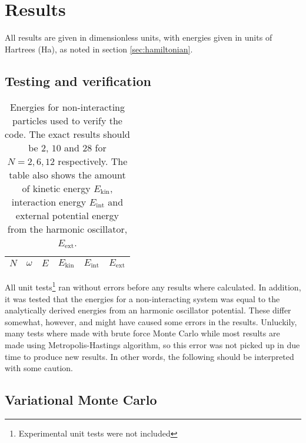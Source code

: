 \documentclass[aps,prb,twocolumn,floatfix]{revtex4}
\begin{document}

\section{Results} \label{sec:results}

All results are given in dimensionless units, with energies given in units of Hartrees (Ha), as noted in section \ref{sec:hamiltonian}.

\subsection{Testing and verification}

\begin{table}
\centering
\begin{tabular}{c c c c c c}
    \hline
    \hline
    $N$ & $\omega$ & $E$ & $E_{\text{kin}}$ & $E_{\text{int}}$ & $E_{\text{ext}}$ \\
    \hline
    
    \hline
    
    \hline
    
    \hline
\end{tabular}
\caption{Energies for non-interacting particles used to verify the code. The exact results should be $2$, $10$ and $28$ for $N=2,6,12$ respectively.\cite{griffiths} The table also shows the amount of kinetic energy $E_{\text{kin}}$, interaction energy $E_{\text{int}}$ and external potential energy from the harmonic oscillator, $E_{\text{ext}}$.}
\label{tab:testingenergytable}
\end{table}  

All unit tests\footnote{Experimental unit tests were not included} ran without errors before any results where calculated. In addition, it was tested that the energies for a non-interacting system was equal to the analytically derived energies from an harmonic oscillator potential.\cite{griffiths} These differ somewhat, however, and might have caused some errors in the results. Unluckily, many tests where made with brute force Monte Carlo while most results are made using Metropolis-Hastings algorithm, so this error was not picked up in due time to produce new results. In other words, the following should be interpreted with some caution.

\subsection{Variational Monte Carlo}
\end{document}
